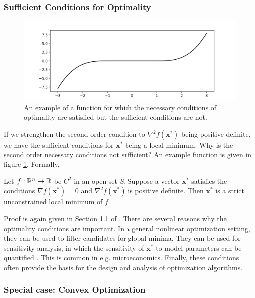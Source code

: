 \subsubsection{Sufficient Conditions for Optimality}


\begin{figure}[t]
    \centering
    \includegraphics[width=0.85\linewidth]{figs/foc.png}
    \caption{An example of a function for which the necessary conditions of optimality are satisfied but the sufficient conditions are not.}
    \label{fig:foc}
\end{figure}


If we strengthen the second order condition to $\nabla^2 f(\bm{x}^*)$ being positive definite, we have the sufficient conditions for $\bm{x}^*$ being a local minimum. Why is the second order necessary conditions not sufficient? An example function is given in figure \ref{fig:foc}. Formally, 

\begin{theorem}
Let $f:\mathbb{R}^n \to \mathbb{R}$ be $C^2$ in an open set $S$. Suppose a vector $\bm{x}^*$ satisfies the conditions $\nabla f(\bm{x}^*) = 0$ and $\nabla^2 f(\bm{x}^*)$ is positive definite. Then $\bm{x}^*$ is a strict unconstrained local minimum of $f$. 
\end{theorem}

Proof is again given in Section 1.1 of \cite{bertsekas2016nonlinear}.
There are several reasons why the optimality conditions are important. In a general nonlinear optimization setting, they can be used to filter candidates for global minima. They can be used for sensitivity analysis, in which the sensitivity of $\bm{x}^*$ to model parameters can be quantified \cite{bertsekas2016nonlinear}. This is common in e.g. microeconomics. Finally, these conditions often provide the basis for the design and analysis of optimization algorithms.

\subsubsection{Special case: Convex Optimization}

